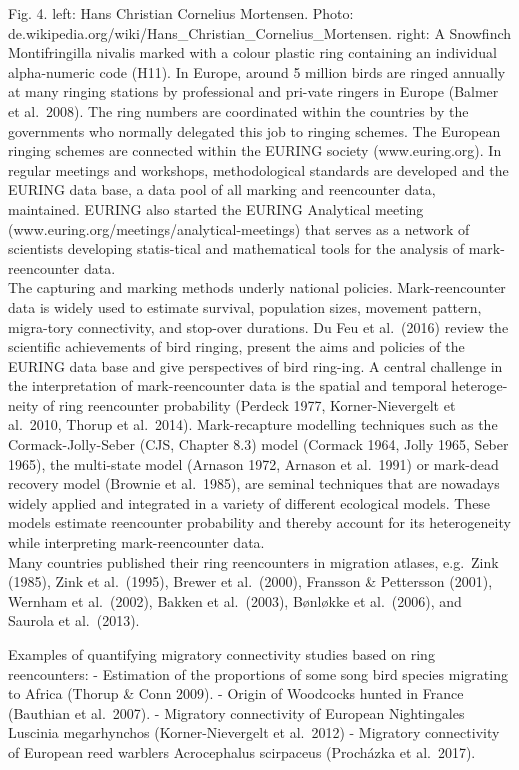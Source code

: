 \documentclass[
]{book}
\begin{document}
Fig. 4. left: Hans Christian Cornelius Mortensen. Photo: de.wikipedia.org/wiki/Hans\_Christian\_Cornelius\_Mortensen. right: A Snowfinch Montifringilla nivalis marked with a colour plastic ring containing an individual alpha-numeric code (H11).
In Europe, around 5 million birds are ringed annually at many ringing stations by professional and pri-vate ringers in Europe (Balmer et al.~2008). The ring numbers are coordinated within the countries by the governments who normally delegated this job to ringing schemes. The European ringing schemes are connected within the EURING society (www.euring.org). In regular meetings and workshops, methodological standards are developed and the EURING data base, a data pool of all marking and reencounter data, maintained. EURING also started the EURING Analytical meeting (www.euring.org/meetings/analytical-meetings) that serves as a network of scientists developing statis-tical and mathematical tools for the analysis of mark-reencounter data.\\
The capturing and marking methods underly national policies.
Mark-reencounter data is widely used to estimate survival, population sizes, movement pattern, migra-tory connectivity, and stop-over durations. Du Feu et al.~(2016) review the scientific achievements of bird ringing, present the aims and policies of the EURING data base and give perspectives of bird ring-ing.
A central challenge in the interpretation of mark-reencounter data is the spatial and temporal heteroge-neity of ring reencounter probability (Perdeck 1977, Korner-Nievergelt et al.~2010, Thorup et al.~2014). Mark-recapture modelling techniques such as the Cormack-Jolly-Seber (CJS, Chapter 8.3) model (Cormack 1964, Jolly 1965, Seber 1965), the multi-state model (Arnason 1972, Arnason et al.~1991) or mark-dead recovery model (Brownie et al.~1985), are seminal techniques that are nowadays widely applied and integrated in a variety of different ecological models. These models estimate reencounter probability and thereby account for its heterogeneity while interpreting mark-reencounter data.\\
Many countries published their ring reencounters in migration atlases, e.g.~Zink (1985), Zink et al.~(1995), Brewer et al.~(2000), Fransson \& Pettersson (2001), Wernham et al.~(2002), Bakken et al.~(2003), Bønløkke et al.~(2006), and Saurola et al.~(2013).

Examples of quantifying migratory connectivity studies based on ring reencounters:
- Estimation of the proportions of some song bird species migrating to Africa (Thorup \& Conn 2009).
- Origin of Woodcocks hunted in France (Bauthian et al.~2007).
- Migratory connectivity of European Nightingales Luscinia megarhynchos (Korner-Nievergelt et al.~2012)
- Migratory connectivity of European reed warblers Acrocephalus scirpaceus (Procházka et al.~2017).
\end{document}
